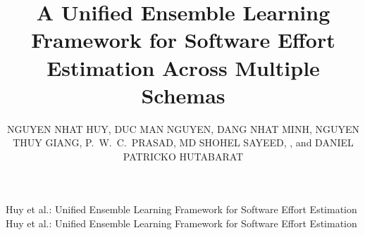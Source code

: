 \documentclass{ieeeaccess}
\begin{document}

\title{A Unified Ensemble Learning Framework for Software Effort Estimation Across Multiple Schemas}

\author{\uppercase{Nguyen Nhat Huy}, \uppercase{Duc Man Nguyen},
\uppercase{Dang Nhat Minh}, \uppercase{Nguyen Thuy Giang},
\uppercase{P.~W.~C.~Prasad}, \uppercase{Md Shohel Sayeed},
, and \uppercase{Daniel Patricko Hutabarat}}

\address[1]{International School, Duy Tan University, Da Nang 550000, Vietnam
(e-mail: nguyennhathuybdi06@gmail.com)}
\address[2]{Faculty of Information Science and Technology, Multimedia University, Malaysia
(e-mail: shohel.sayeed@mmu.edu.my)}
\address[3]{Department of Computer Engineering, Faculty of Engineering, Bina Nusantara University, Jakarta, Indonesia}


\markboth
{Huy et al.: Unified Ensemble Learning Framework for Software Effort Estimation}
{Huy et al.: Unified Ensemble Learning Framework for Software Effort Estimation}
\end{document}
